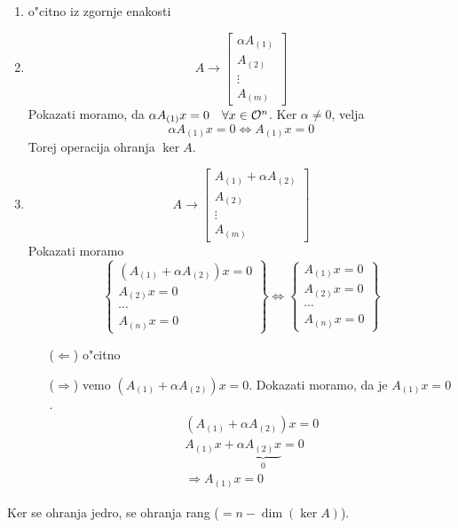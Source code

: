 \begin{enumerate}[V1)]
	\item o"citno iz zgornje enakosti
	\item \begin{equation*}
	A \to 
	\begin{bmatrix}
	\alpha A_{(1)} \\
	A_{(2)} \\
	\vdots \\
	A_{(m)}
	\end{bmatrix}
	\end{equation*}
	Pokazati moramo, da $\alpha A_{(1)} x = 0 \quad \forall x \in \mathcal{O}^n$. Ker $\alpha \neq 0$, velja
	\begin{equation*}
	\alpha A_{(1)} x = 0 \iff A_{(1)} x = 0
	\end{equation*}
	Torej operacija ohranja $\ker A$.
	
	\item
	\begin{equation*}
	A \to 
	\begin{bmatrix}
	A_{(1)} +  \alpha A_{(2)} \\
	A_{(2)} \\
	\vdots \\
	A_{(m)}
	\end{bmatrix}
	\end{equation*}
	Pokazati moramo
	\begin{equation*}
	\begin{Bmatrix}
	(A_{(1)} + \alpha A_{(2)}) x = 0 \\
	A_{(2)} x = 0 \\
	\cdots \\
	A_{(n)} x = 0
	\end{Bmatrix}
	\iff
	\begin{Bmatrix}
	A_{(1)}x = 0 \\
	A_{(2)} x = 0 \\
	\cdots \\
	A_{(n)} x = 0
	\end{Bmatrix}
	\end{equation*}
	\begin{itemize}
		\item[($\Leftarrow$)] o"citno
		\item [($\Rightarrow$)] vemo $(A_{(1)} + \alpha A_{(2)}) x = 0$. Dokazati moramo, da je $A_{(1)} x = 0$.
		\begin{gather*}
			(A_{(1)} + \alpha A_{(2)}) x = 0 \\
			A_{(1)} x + \alpha \underbrace{A_{(2)} x}_{0} = 0 \\
			\Rightarrow A_{(1)} x = 0
		\end{gather*}
	\end{itemize}
\end{enumerate}
Ker se ohranja jedro, se ohranja rang ($= n - \dim (\ker A)$).

